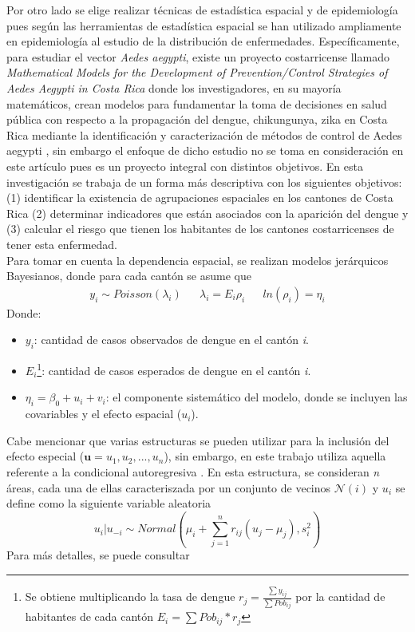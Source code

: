 \documentclass[a4paper,12pt]{report}
\begin{document}
Por otro lado se elige realizar técnicas de estadística espacial y de epidemiología pues según \cite{sp} las herramientas de estadística espacial se han utilizado ampliamente en epidemiología al estudio de la distribución de enfermedades. Específicamente, para estudiar el vector \textit{Aedes aegypti}, existe un proyecto costarricense llamado \textit{Mathematical Models for the Development of Prevention/Control Strategies of Aedes Aegypti in Costa Rica} donde los investigadores, en su mayoría matemáticos, crean modelos para fundamentar la toma de decisiones en salud pública con respecto a la propagación del dengue, chikungunya, zika en Costa Rica mediante la identificación y caracterización de métodos de control de Aedes aegypti \cite{ucrea}, sin embargo el enfoque de dicho estudio no se toma en consideración en este artículo pues es un proyecto integral con distintos objetivos. En esta investigación se trabaja de un forma más descriptiva con los siguientes objetivos: (1) identificar la existencia de agrupaciones espaciales en los cantones de Costa Rica (2) determinar indicadores que están asociados con la aparición del dengue y (3) calcular el riesgo que tienen los habitantes de los cantones costarricenses de tener esta enfermedad.\\
Para tomar en cuenta la dependencia espacial,  se realizan modelos jerárquicos Bayesianos, donde para cada cantón se asume que
\begin{align}
y_{i}\sim Poisson(\lambda_{i})  &  & \lambda_{i} = E_{i}\rho_{i}  & & ln(\rho_{i})=\eta_{i}
\end{align}
Donde:
\begin{itemize}
\item $y_{i}$: cantidad de casos observados de dengue en el cantón \textit{i}.
\item $E_{i}$\footnote{Se obtiene multiplicando la tasa de dengue $r_{j} = \frac{\sum y_{ij}}{\sum Pob_{ij}}$ por la cantidad de habitantes de cada cantón $E_{i} = \sum Pob _{ij}* r_{j}$}: cantidad de casos esperados de dengue en el cantón \textit{i}.
\item $\eta_{i} = \beta_{0} + u_{i} + v_{i}$: el componente sistemático del modelo, donde se incluyen las covariables y el efecto espacial ($u_{i}$).
\end{itemize}
Cabe mencionar que varias estructuras se pueden utilizar para la inclusión del efecto especial ($\textbf{u} = {u_{1}, u_{2}, ..., u_{n}}$), sin embargo, en este trabajo utiliza aquella referente a la condicional autoregresiva \cite{sp}. En esta estructura, se consideran \textit{n} áreas, cada una de ellas caracteriszada por un conjunto de vecinos $\mathcal{N}(i)$ y \textit{$u_{i}$} se define como la siguiente variable aleatoria $$u_{i}|u_{-i}\sim Normal \left ( \mu_{i}+\sum_{j=1}^{n}r_{ij}(u_{j}-\mu_{j}), s^{2}_{i}\right )$$
Para más detalles, se puede consultar \cite{sp}
\end{document}
